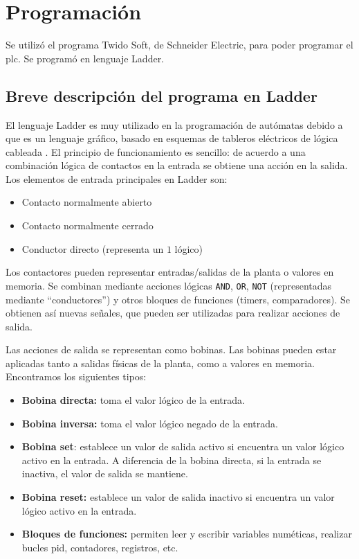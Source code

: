 \section{Programación}
\label{sec:Programacion}
Se utilizó el programa Twido Soft, de Schneider Electric, para poder programar
el \gls{plc}. Se programó en lenguaje Ladder.

\subsection{Breve descripción del programa en Ladder}

El lenguaje Ladder es muy utilizado en la programación de autómatas debido a
que es un lenguaje gráfico, basado en esquemas de tableros eléctricos de
lógica cableada \cite{bib:ApuntesPuglesiPLC}.
El principio de funcionamiento es sencillo: de acuerdo a una combinación
lógica de contactos en la entrada se obtiene una acción en la
salida.
Los elementos de entrada principales en Ladder son:

 \begin{itemize}
  \item Contacto normalmente abierto
  \item Contacto normalmente cerrado
  \item Conductor directo (representa un $1$ lógico)
 \end{itemize}

Los contactores pueden representar entradas/salidas de la
planta o valores en memoria.
Se combinan mediante acciones lógicas \verb|AND|, \verb|OR|, \verb|NOT|
(representadas mediante ``conductores'') y otros bloques de funciones (timers,
comparadores).
Se obtienen así nuevas señales, que pueden ser utilizadas para realizar
acciones de salida.

Las acciones de salida se representan como bobinas.
Las bobinas pueden estar aplicadas tanto a salidas físicas de la planta, como a
valores en memoria. Encontramos los siguientes tipos:

  \begin{itemize}
   \item \textbf{Bobina directa:} toma el valor lógico de la entrada.
   \item \textbf{Bobina inversa:} toma el valor lógico negado de la entrada.
   \item \textbf{Bobina set}: establece un valor de salida activo si encuentra
un valor lógico activo en la entrada. A diferencia de la bobina directa, si la
entrada se inactiva, el valor de salida se mantiene.
   \item \textbf{Bobina reset:} establece un valor de salida inactivo si
encuentra un valor lógico activo en la entrada.
   \item \textbf{Bloques de funciones:} permiten leer y escribir variables
numéticas, realizar bucles \gls{pid}, contadores, registros, etc.
  \end{itemize}

